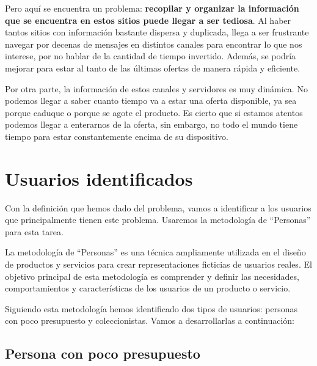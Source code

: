 Pero aquí se encuentra un problema: \textbf{recopilar y organizar la información 
que se encuentra en estos sitios puede llegar a ser tediosa}. Al haber tantos 
sitios con información bastante dispersa y duplicada, llega a ser frustrante 
navegar por decenas de mensajes en distintos canales para encontrar lo que nos 
interese, por no hablar de la cantidad de tiempo invertido. Además, se podría 
mejorar para estar al tanto de las últimas ofertas de manera rápida y eficiente.

Por otra parte, la información de estos canales y servidores es muy dinámica. No 
podemos llegar a saber cuanto tiempo va a estar una oferta disponible, ya sea 
porque caduque o porque se agote el producto. Es cierto que si estamos atentos 
podemos llegar a enterarnos de la oferta, sin embargo, no todo el mundo tiene tiempo 
para estar constantemente encima de su dispositivo.

\section{Usuarios identificados}

Con la definición que hemos dado del problema, vamos a identificar a los usuarios 
que principalmente tienen este problema. Usaremos la metodología de ``Personas'' para 
esta tarea.

La metodología de ``Personas'' es una técnica ampliamente utilizada en el diseño de 
productos y servicios para crear representaciones ficticias de usuarios reales. El 
objetivo principal de esta metodología es comprender y definir las necesidades, 
comportamientos y características de los usuarios de un producto o servicio.

Siguiendo esta metodología hemos identificado dos tipos de usuarios: personas con 
poco presupuesto y coleccionistas. Vamos a desarrollarlas a continuación:

\subsection{Persona con poco presupuesto}

